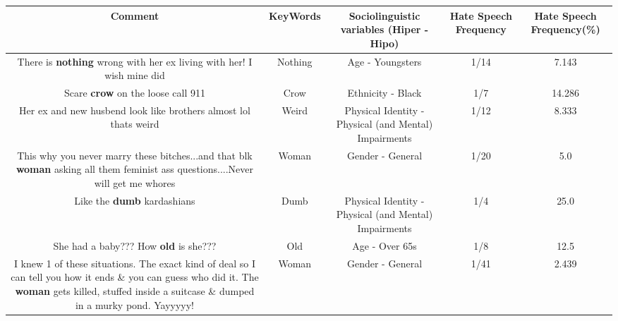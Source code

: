 \documentclass[11pt]{article}
\newlength\mylength
\begin{document}
\begin{center}
\setlength\mylength{\dimexpr\textwidth - 1\arrayrulewidth - 50\tabcolsep}
\begin{longtable}{|C{.65\mylength}|C{.30\mylength}|C{.12\mylength}|C{.12\mylength}|C{.12\mylength}|}
\hline
\textbf{Comment} & \textbf{KeyWords} & \textbf{Sociolinguistic variables (Hiper - Hipo)}  & \textbf{Hate Speech Frequency} & \textbf{Hate Speech Frequency(\%)} \\
\hline{}\small There is \textbf{nothing} wrong with her ex living with her! I wish mine did\normalsize   & Nothing & Age - Youngsters & 1/14 & 7.143 \\  \hline
  \small Scare \textbf{crow} on the loose call 911\normalsize   & Crow & Ethnicity - Black & 1/7 & 14.286 \\  \hline
  \small Her ex and new husbend look like brothers almost lol thats weird\normalsize   & Weird & Physical Identity - Physical (and Mental) Impairments & 1/12 & 8.333 \\  \hline
  \small This why you never marry these bitches...and that blk \textbf{woman} asking all them feminist ass questions....Never will get me whores\normalsize   & Woman & Gender - General & 1/20 & 5.0 \\  \hline
  \small Like the \textbf{dumb} kardashians\normalsize   & Dumb & Physical Identity - Physical (and Mental) Impairments & 1/4 & 25.0 \\  \hline
  \small She had a baby??? How \textbf{old} is she???\normalsize   & Old & Age - Over 65s & 1/8 & 12.5 \\  \hline
  \small I knew 1 of these situations. The exact kind of deal so I can tell you how it ends \& you can guess who did it. The \textbf{woman} gets killed, stuffed inside a suitcase \& dumped in a murky pond. Yayyyyy!\normalsize   & Woman & Gender - General & 1/41 & 2.439 \\  \hline

\end{longtable}
\end{center}
\end{document}
